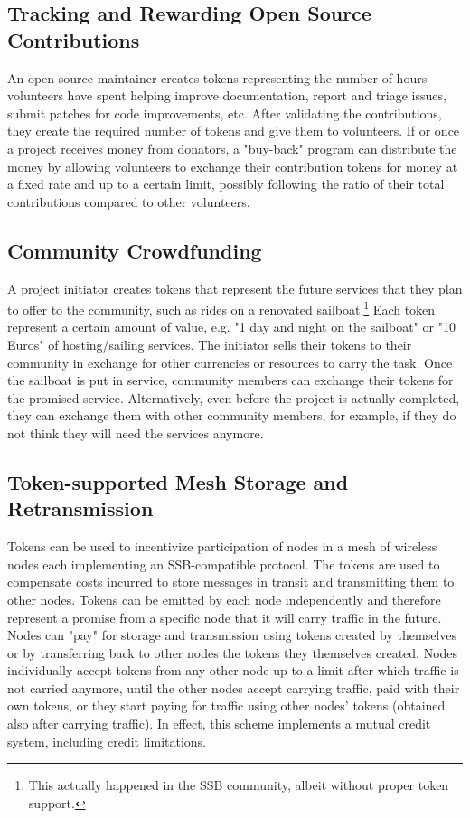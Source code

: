 \documentclass[sigplan,screen,10pt]{acmart}
\begin{document}
\subsection{Tracking and Rewarding Open Source Contributions}

An open source maintainer creates tokens representing the number of hours volunteers have spent helping improve documentation, report and triage issues, submit patches for code improvements, etc. After validating the contributions, they create the required number of tokens and give them to volunteers. If or once a project receives money from donators, a "buy-back" program can distribute the money by allowing volunteers to exchange their contribution tokens for money at a fixed rate and up to a certain limit, possibly following the ratio of their total contributions compared to other volunteers.

\subsection{Community Crowdfunding}

A project initiator creates tokens that represent the future services that they plan to offer to the community, such as rides on a renovated sailboat.\footnote{This actually happened in the SSB community, albeit without proper token support.} Each token represent a certain amount of value, e.g. "1 day and night on the sailboat" or "10 Euros" of hosting/sailing services. The initiator sells their tokens to their community in exchange for other currencies or resources to carry the task. Once the sailboat is put in service, community members can exchange their tokens for the promised service. Alternatively, even before the project is actually completed, they can exchange them with other community members, for example, if they do not think they will need the services anymore.

\subsection{Token-supported Mesh Storage and Retransmission}

Tokens can be used to incentivize participation of nodes in a mesh of wireless nodes each implementing an SSB-compatible protocol. The tokens are used to compensate  costs incurred to store messages in transit and transmitting them to other nodes. Tokens can be emitted by each node independently and therefore represent a promise from a specific node that it will carry traffic in the future. Nodes can "pay" for storage and transmission using tokens created by themselves or by transferring back to other nodes the tokens they themselves created. Nodes individually accept tokens from any other node up to a limit after which traffic is not carried anymore, until the other nodes accept carrying traffic, paid with their own tokens, or they start paying for traffic using other nodes' tokens (obtained also after carrying traffic). In effect, this scheme implements a mutual credit system, including credit limitations.
\end{document}
